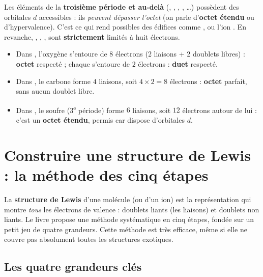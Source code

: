\documentclass[11pt,a4paper]{article}
\begin{document}
\begin{attention}
Les éléments de la \textbf{troisième période et au-delà} (, , , ,
\ldots) possèdent des orbitales $d$ accessibles : ils \emph{peuvent dépasser l'octet}
(on parle d'\textbf{octet étendu} ou d'hypervalence). C'est ce qui rend possibles des édifices
comme ,  ou l'ion . En revanche, , , ,  sont
\textbf{strictement} limités à huit électrons.
\end{attention}

\begin{exemple}
\begin{itemize}[leftmargin=1.5em,topsep=2pt,itemsep=3pt]
  \item Dans , l'oxygène s'entoure de $8$ électrons (2 liaisons + 2 doublets libres) :
        \textbf{octet} respecté ; chaque  s'entoure de $2$ électrons : \textbf{duet}
        respecté.
  \item Dans , le carbone forme $4$ liaisons, soit $4\times 2 = 8$ électrons :
        \textbf{octet} parfait, sans aucun doublet libre.
  \item Dans , le soufre (3\textsuperscript{e} période) forme $6$ liaisons, soit
        $12$ électrons autour de lui : c'est un \textbf{octet étendu}, permis car  dispose
        d'orbitales $d$.
\end{itemize}
\end{exemple}

\section{Construire une structure de Lewis : la méthode des cinq étapes}
\label{sec:methode}

La \textbf{structure de Lewis} d'une molécule (ou d'un ion) est la représentation qui montre
\emph{tous} les électrons de valence : doublets liants (les liaisons) et doublets non liants. Le
livre propose une méthode systématique en cinq étapes, fondée sur un petit jeu de quatre
grandeurs. Cette méthode est très efficace, même si elle ne couvre pas absolument toutes les
structures exotiques.

\subsection{Les quatre grandeurs clés}
\end{document}

